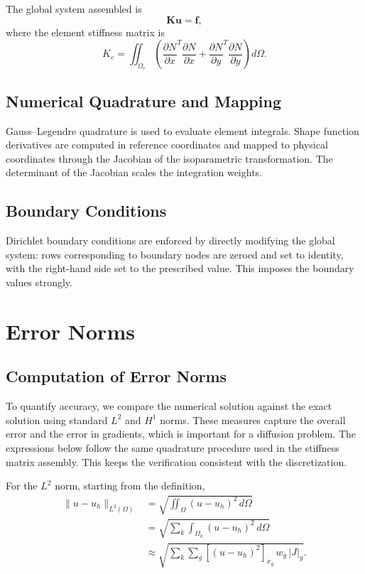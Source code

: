 \documentclass[12pt]{article}
\begin{document}
The global system assembled is
\begin{equation}
\mathbf{K} \mathbf{u} = \mathbf{f},
\end{equation}
where the element stiffness matrix is
\begin{equation}
K_e = \iint_{\Omega_e} \left( \frac{\partial N}{\partial x}^T \frac{\partial N}{\partial x} + \frac{\partial N}{\partial y}^T \frac{\partial N}{\partial y} \right) d\Omega.
\end{equation}

\subsection{Numerical Quadrature and Mapping}
Gauss--Legendre quadrature is used to evaluate element integrals. Shape function derivatives are computed in reference coordinates and mapped to physical coordinates through the Jacobian of the isoparametric transformation. The determinant of the Jacobian scales the integration weights.

\subsection{Boundary Conditions}
Dirichlet boundary conditions are enforced by directly modifying the global system: rows corresponding to boundary nodes are zeroed and set to identity, with the right-hand side set to the prescribed value. This imposes the boundary values strongly.

\clearpage

\section{Error Norms}
\subsection{Computation of Error Norms}
To quantify accuracy, we compare the numerical solution against the exact solution using standard $L^2$ and $H^1$ norms. These measures capture the overall error and the error in gradients, which is important for a diffusion problem. The expressions below follow the same quadrature procedure used in the stiffness matrix assembly. This keeps the verification consistent with the discretization.

For the $L^2$ norm, starting from the definition,
\begin{align}
\lVert u-u_h \rVert_{L^2(\Omega)}
&= \sqrt{ \iint_{\Omega} (u-u_h)^2\, d\Omega } \\
&= \sqrt{ \sum_{k} \int_{\Omega_k} (u-u_h)^2\, d\Omega } \\
&\approx \sqrt{ \sum_{k} \sum_{g} \left[(u-u_h)^2\right]_{x_g}\, w_g\, |J|_g }.
\end{align}
\end{document}
